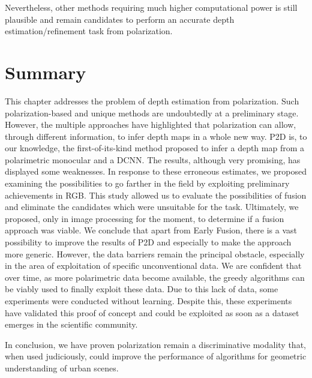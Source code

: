 Nevertheless, other methods requiring much higher computational power is still plausible and remain candidates to perform an accurate depth estimation/refinement task from polarization.

\section{Summary}

This chapter addresses the problem of depth estimation from polarization. Such polarization-based and unique methods are undoubtedly at a preliminary stage. However, the multiple approaches have highlighted that polarization can allow, through different information, to infer depth maps in a whole new way. 
P2D is, to our knowledge, the first-of-its-kind method proposed to infer a depth map from a polarimetric monocular and a DCNN. The results, although very promising, has displayed some weaknesses.
In response to these erroneous estimates, we proposed examining the possibilities to go farther in the field by exploiting preliminary achievements in RGB. This study allowed us to evaluate the possibilities of fusion and eliminate the candidates which were unsuitable for the task. Ultimately, we proposed, only in image processing for the moment, to determine if a fusion approach was viable.
We conclude that apart from Early Fusion, there is a vast possibility to improve the results of P2D and especially to make the approach more generic. However, the data barriers remain the principal obstacle, especially in the area of exploitation of specific unconventional data. We are confident that over time, as more polarimetric data become available, the greedy algorithms can be viably used to finally exploit these data.
Due to this lack of data, some experiments were conducted without learning. Despite this, these experiments have validated this proof of concept and could be exploited as soon as a dataset emerges in the scientific community.

In conclusion, we have proven polarization remain a discriminative modality that, when used judiciously, could improve the performance of algorithms for geometric understanding of urban scenes.


